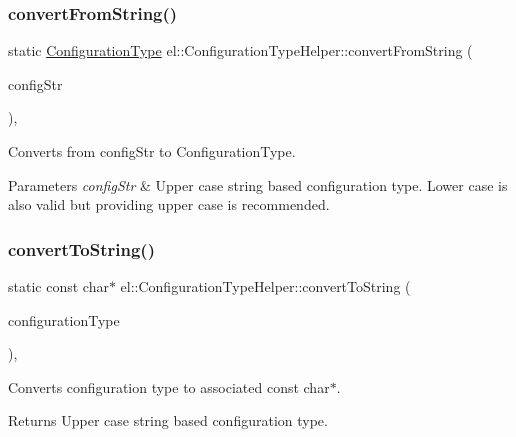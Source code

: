 \subsubsection{\texorpdfstring{convert\+From\+String()}{convertFromString()}}
{\footnotesize\ttfamily static \hyperlink{namespaceel_a281f5db6d6163678bc68a8b23b59e124}{Configuration\+Type} el\+::\+Configuration\+Type\+Helper\+::convert\+From\+String (\begin{DoxyParamCaption}\item[{const char $\ast$}]{config\+Str }\end{DoxyParamCaption})\hspace{0.3cm}{\ttfamily [inline]}, {\ttfamily [static]}}



Converts from config\+Str to Configuration\+Type. 


\begin{DoxyParams}{Parameters}
{\em config\+Str} & Upper case string based configuration type. Lower case is also valid but providing upper case is recommended. \\
\hline
\end{DoxyParams}
\mbox{\label{classel_1_1_configuration_type_helper_ad7f0a19c416c4a8ddaf85330b141383c}} 
\subsubsection{\texorpdfstring{convert\+To\+String()}{convertToString()}}
{\footnotesize\ttfamily static const char$\ast$ el\+::\+Configuration\+Type\+Helper\+::convert\+To\+String (\begin{DoxyParamCaption}\item[{\hyperlink{namespaceel_a281f5db6d6163678bc68a8b23b59e124}{Configuration\+Type}}]{configuration\+Type }\end{DoxyParamCaption})\hspace{0.3cm}{\ttfamily [inline]}, {\ttfamily [static]}}



Converts configuration type to associated const char$\ast$. 

\begin{DoxyReturn}{Returns}
Upper case string based configuration type. 
\end{DoxyReturn}
\mbox{\label{classel_1_1_configuration_type_helper_aa0524147f792309fc09e0b8d14826c17}} 

